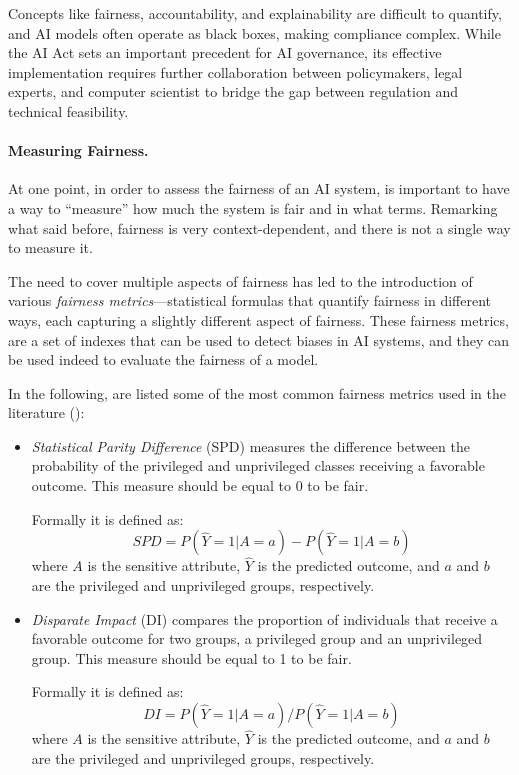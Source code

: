 \documentclass[12pt,a4paper,openright,twoside]{book}
\begin{document}
Concepts like fairness, accountability, and explainability are difficult to quantify, and AI models often operate as black boxes, making compliance complex.
%
While the AI Act sets an important precedent for AI governance, its effective implementation requires further collaboration between policymakers, legal experts, and computer scientist to bridge the gap between regulation and technical feasibility.


\paragraph{Measuring Fairness.}

At one point, in order to assess the fairness of an \ac{AI} system, is important to have a way to ``measure'' how much the system is fair and in what terms.
%
Remarking what said before, fairness is very context-dependent, and there is not a single way to measure it. 


The need to cover multiple aspects of fairness has led to the introduction of various \textit{fairness metrics}---statistical formulas that quantify fairness in different ways, each capturing a slightly different aspect of fairness.
%
These fairness metrics, are a set of indexes that can be used to detect biases in \ac{AI} systems, and they can be used indeed to evaluate the fairness of a model.
%


In the following, are listed some of the most common fairness metrics used in the literature (\cite{DBLP:conf/bias/IrfanML23}):

\begin{itemize}
    \item \textit{Statistical Parity Difference} (SPD) measures the difference between the probability of the privileged and unprivileged classes receiving a favorable outcome. This measure should be equal to 0 to be fair.
    
    Formally it is defined as:
    \[
        SPD = P(\hat{Y} = 1 | A = a) - P(\hat{Y} = 1 | A = b)
    \]
    where $A$ is the sensitive attribute, $\hat{Y}$ is the predicted outcome, and $a$ and $b$ are the privileged and unprivileged groups, respectively.
    
    \item \textit{Disparate Impact} (DI) compares the proportion of individuals that receive a favorable outcome for two groups, a privileged group and an unprivileged group. This measure should be equal to 1 to be fair.
    
    Formally it is defined as:
    \[
        DI = P(\hat{Y} = 1 | A = a) / P(\hat{Y} = 1 | A = b)
    \]
    where $A$ is the sensitive attribute, $\hat{Y}$ is the predicted outcome, and $a$ and $b$ are the privileged and unprivileged groups, respectively.
    
\end{itemize}
\end{document}

